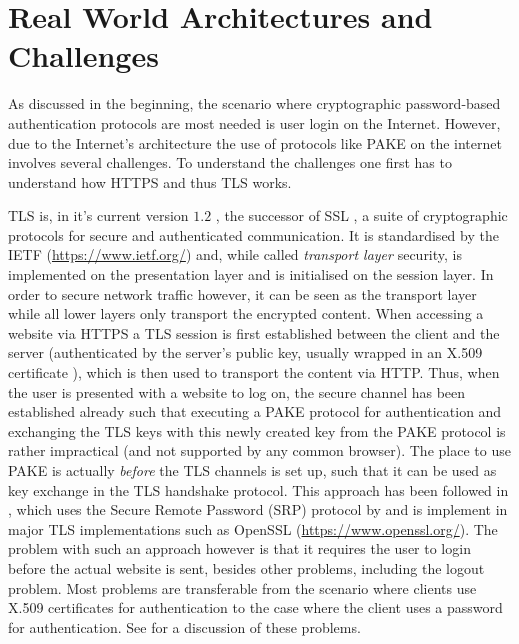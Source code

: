 \section{Real World Architectures and Challenges}\label{sec:intro:real-world}
As discussed in the beginning, the scenario where cryptographic password-based authentication protocols are most needed is user login on the Internet.
However, due to the Internet's architecture the use of protocols like \ac{PAKE} on the internet involves several challenges.
To understand the challenges one first has to understand how \ac{HTTPS} and thus \ac{TLS} works.

\ac{TLS} is, in it's current version $1.2$ \cite{rfc5246,rfc6176,rfc4492}, the successor of \ac{SSL} \cite{rfc6101}, a suite of cryptographic protocols for secure and authenticated communication.
It is standardised by the \ac{IETF} (\url{https://www.ietf.org/}) and, while called \emph{transport layer} security, is implemented on the presentation layer and is initialised on the session layer.
In order to secure network traffic however, it can be seen as the transport layer while all lower layers only transport the encrypted content.
When accessing a website via \ac{HTTPS} a \ac{TLS} session is first established between the client and the server (authenticated by the server's public key, usually wrapped in an X.509 certificate \cite{rfc5280}), which is then used to transport the content via \ac{HTTP}.
Thus, when the user is presented with a website to log on, the secure channel has been established already such that executing a \ac{PAKE} protocol for authentication and exchanging the \ac{TLS} keys with this newly created key from the \ac{PAKE} protocol is rather impractical (and not supported by any common browser).
The place to use \ac{PAKE} is actually \emph{before} the \ac{TLS} channels is set up, such that it can be used as key exchange in the \ac{TLS} handshake protocol.
This approach has been followed in \cite{rfc5054}, which uses the Secure Remote Password (SRP) protocol by \cite{Wu98} and is implement in major \ac{TLS} implementations such as OpenSSL (\url{https://www.openssl.org/}).
The problem with such an approach however is that it requires the user to login before the actual website is sent, besides other problems, including the logout problem.
Most problems are transferable from the scenario where clients use X.509 certificates for authentication to the case where the client uses a password for authentication.
See \citet{Parsovs14} for a discussion of these problems.

